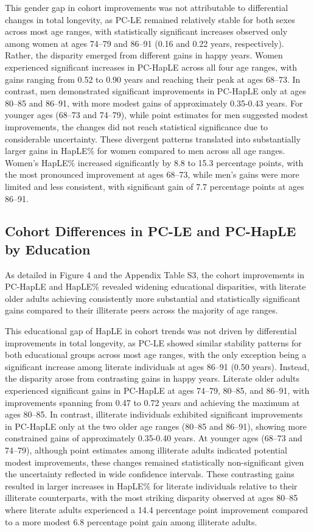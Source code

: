 \documentclass[12pt, a4paper]{article}
\begin{document}
This gender gap in cohort improvements was not attributable to differential changes in total longevity, as PC-LE remained relatively stable for both sexes across most age ranges, with statistically significant increases observed only among women at ages 74–79 and 86–91 (0.16 and 0.22 years, respectively). Rather, the disparity emerged from different gains in happy years. Women experienced significant increases in PC-HapLE across all four age ranges, with gains ranging from 0.52 to 0.90 years and reaching their peak at ages 68–73. In contrast, men demonstrated significant improvements in PC-HapLE only at ages 80–85 and 86–91, with more modest gains of approximately 0.35-0.43 years. For younger ages (68–73 and 74–79), while point estimates for men suggested modest improvements, the changes did not reach statistical significance due to considerable uncertainty. These divergent patterns translated into substantially larger gains in HapLE\% for women compared to men across all age ranges. Women's HapLE\% increased significantly by 8.8 to 15.3 percentage points, with the most pronounced improvement at ages 68–73, while men's gains were more limited and less consistent, with significant gain of 7.7 percentage points at ages 86–91.

\subsection{Cohort Differences in PC-LE and PC-HapLE by Education}

As detailed in Figure 4 and the Appendix Table S3, the cohort improvements in PC-HapLE and HapLE\% revealed widening educational disparities, with literate older adults achieving consistently more substantial and statistically significant gains compared to their illiterate peers across the majority of age ranges.

This educational gap of HapLE in cohort trends was not driven by differential improvements in total longevity, as PC-LE showed similar stability patterns for both educational groups across most age ranges, with the only exception being a significant increase among literate individuals at ages 86–91 (0.50 years). Instead, the disparity arose from contrasting gains in happy years. Literate older adults experienced significant gains in PC-HapLE at ages 74–79, 80–85, and 86–91, with improvements spanning from 0.47 to 0.72 years and achieving the maximum at ages 80–85. In contrast, illiterate individuals exhibited significant improvements in PC-HapLE only at the two older age ranges (80–85 and 86–91), showing more constrained gains of approximately 0.35-0.40 years. At younger ages (68–73 and 74–79), although point estimates among illiterate adults indicated potential modest improvements, these changes remained statistically non-significant given the uncertainty reflected in wide confidence intervals. These contrasting gains resulted in larger increases in HapLE\% for literate individuals relative to their illiterate counterparts, with the most striking disparity observed at ages 80–85 where literate adults experienced a 14.4 percentage point improvement compared to a more modest 6.8 percentage point gain among illiterate adults.
\end{document}
